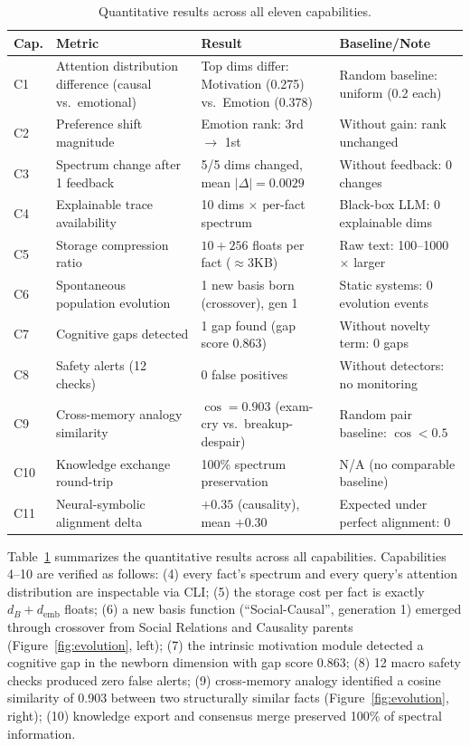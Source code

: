 \documentclass[review]{elsarticle}
\begin{document}
\begin{table}[t]
\centering
\caption{Quantitative results across all eleven capabilities.}
\label{tab:results}
\begin{tabular}{p{}p{}p{}p{}}
\toprule
\textbf{Cap.} & \textbf{Metric} & \textbf{Result} & \textbf{Baseline/Note} \\
\midrule
C1 & Attention distribution difference (causal vs.\ emotional) & Top dims differ: Motivation (0.275) vs.\ Emotion (0.378) & Random baseline: uniform (0.2 each) \\
C2 & Preference shift magnitude & Emotion rank: 3rd $\to$ 1st & Without gain: rank unchanged \\
C3 & Spectrum change after 1 feedback & 5/5 dims changed, mean $|\Delta|=0.0029$ & Without feedback: 0 changes \\
C4 & Explainable trace availability & 10 dims $\times$ per-fact spectrum & Black-box LLM: 0 explainable dims \\
C5 & Storage compression ratio & $10 + 256$ floats per fact ($\approx$3KB) & Raw text: 100--1000$\times$ larger \\
C6 & Spontaneous population evolution & 1 new basis born (crossover), gen 1 & Static systems: 0 evolution events \\
C7 & Cognitive gaps detected & 1 gap found (gap score 0.863) & Without novelty term: 0 gaps \\
C8 & Safety alerts (12 checks) & 0 false positives & Without detectors: no monitoring \\
C9 & Cross-memory analogy similarity & $\cos = 0.903$ (exam-cry vs.\ breakup-despair) & Random pair baseline: $\cos < 0.5$ \\
C10 & Knowledge exchange round-trip & 100\% spectrum preservation & N/A (no comparable baseline) \\
C11 & Neural-symbolic alignment delta & $+0.35$ (causality), mean $+0.30$ & Expected under perfect alignment: 0 \\
\bottomrule
\end{tabular}
\end{table}

Table~\ref{tab:results} summarizes the quantitative results across all
capabilities. Capabilities 4--10 are verified as follows: (4) every fact's
spectrum and every query's attention distribution are inspectable via CLI;
(5) the storage cost per fact is exactly $d_B + d_{\text{emb}}$ floats; (6)
a new basis function (``Social-Causal'', generation 1) emerged through
crossover from Social Relations and Causality parents (Figure~\ref{fig:evolution},
left); (7) the intrinsic motivation module detected a cognitive gap in the
newborn dimension with gap score 0.863; (8) 12 macro safety checks produced
zero false alerts; (9) cross-memory analogy identified a cosine similarity
of 0.903 between two structurally similar facts (Figure~\ref{fig:evolution},
right); (10) knowledge export and consensus merge preserved 100\% of spectral
information.
\end{document}
